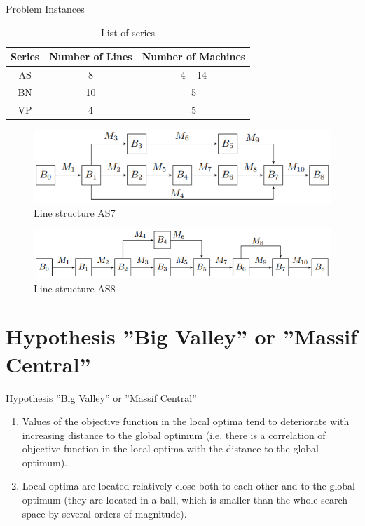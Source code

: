 \documentclass[aspectratio=169,xcolor=dvipsnames]{beamer}
\begin{document}
\begin{frame}{Problem Instances}
\begin{table}[!ht]
\centering
\small
\begin{tabular}{|c|c|c|}
\hline
 \textbf{Series}& \textbf{Number of Lines}& \textbf{Number of Machines}\\
\hline
AS & 8 & 4 -- 14 \\
BN & 10 & 5 \\
VP & 4 & 5 \\
\hline
\end{tabular}
\caption{List of series}\label{tabl:series}
\end{table}
\vspace{-0.2cm}	
 \begin{figure}[h!]
	\centering
	\includegraphics[scale=0.6]{ans7}
\vspace{-0.3cm}	
  \caption{Line structure AS7} \label{fig:vis_as7}
  \end{figure}
\vspace{-0.2cm}	
 \begin{figure}[h!]
	\centering
	\includegraphics[scale=0.55]{ans8}
	\vspace{-0.3cm}
  \caption{Line structure AS8} \label{fig:vis_as8}
  \end{figure}
\end{frame}

\section{Hypothesis ''Big Valley'' or ''Massif Central''}

\begin{frame}{Hypothesis ''Big Valley'' or ''Massif Central''}
\begin{enumerate}
\item Values of the objective function in the local optima tend to deteriorate with increasing distance to the global optimum (i.e. there is a correlation 
of objective function in the local optima with the distance to the global optimum).
\item Local optima are located relatively close both to each other and to the global optimum (they are located in a ball, which is smaller than 
the whole search space by several orders of magnitude).
\end{enumerate}
\end{frame}
\end{document}

